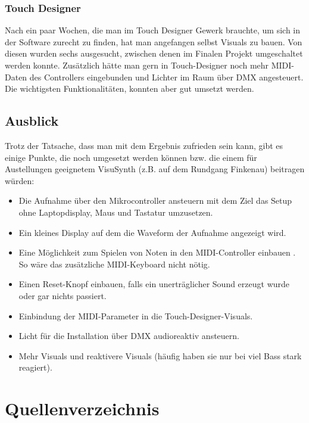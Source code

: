 \documentclass[12pt]{scrartcl}%
\theoremstyle{nonumberplain}
\begin{document}
\subsubsection{Touch Designer}

Nach ein paar Wochen, die man im Touch Designer Gewerk brauchte, um sich in der Software zurecht zu finden, hat man angefangen selbst Visuals zu bauen. Von diesen wurden sechs ausgesucht, zwischen denen im Finalen Projekt umgeschaltet werden konnte. Zusätzlich hätte man gern in Touch-Designer noch mehr MIDI-Daten des Controllers eingebunden und Lichter im Raum über DMX angesteuert. Die wichtigsten Funktionalitäten, konnten aber gut umsetzt werden. 

\subsection{Ausblick}

Trotz der Tatsache, dass man mit dem Ergebnis zufrieden sein kann, gibt es einige Punkte, die noch umgesetzt werden können bzw. die einem für Austellungen geeignetem VisuSynth (z.B. auf dem Rundgang Finkenau) beitragen würden:
\begin{itemize}
  \item Die Aufnahme über den Mikrocontroller ansteuern mit dem Ziel das Setup ohne Laptopdisplay, Maus und Tastatur umzusetzen.
  \item Ein kleines Display auf dem die Waveform der Aufnahme angezeigt wird.
  \item Eine Möglichkeit zum Spielen von Noten in den MIDI-Controller einbauen . So wäre das zusätzliche MIDI-Keyboard nicht nötig.
   \item Einen Reset-Knopf einbauen, falls ein unerträglicher Sound erzeugt wurde oder gar nichts passiert.
   \item Einbindung der MIDI-Parameter in die Touch-Designer-Visuals.
   \item Licht für die Installation über DMX audioreaktiv ansteuern.
   \item Mehr Visuals und reaktivere Visuals (häufig haben sie nur bei viel Bass stark reagiert).

\end{itemize}

\section{Quellenverzeichnis}
\end{document}
